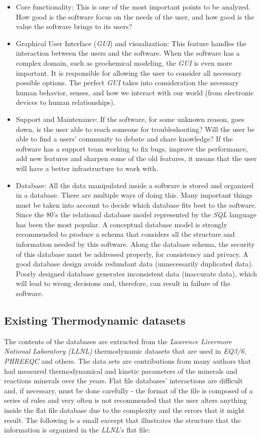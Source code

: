 \begin{itemize}
\item Core functionality: This is one of the most important points to be analyzed. How good is the software focus on the needs of the user, and how good is the value the software brings to its users?

\item Graphical User Interface (\emph{GUI}) and visualization: This feature handles the interaction between the users and the software. When the software has a complex domain, such as geochemical modeling, the \emph{GUI} is even more important. It is responsible for allowing the user to consider all necessary possible options. The perfect \emph{GUI} takes into consideration the necessary human behavior, senses, and how we interact with our world (from electronic devices to human relationships).

\item Support and Maintenance: If the software, for some unknown reason, goes down, is the user able to reach someone for troubleshooting? Will the user be able to find a users' community to debate and share knowledge? If the software has a support team working to fix bugs, improve the performance, add new features and sharpen some of the old features, it means that the user will have a better infrastructure to work with.

\item Database: All the data manipulated inside a software is stored and organized in a database. There are multiple ways of doing this. Many important things must be taken into account to decide which database fits best to the software. Since the 80's the relational database model represented by the \emph{SQL} language has been the most popular. A conceptual database model is strongly recommended to produce a schema that considers all the structure and information needed by this software. Along the database schema, the security of this database must be addressed properly, for consistency and privacy. A good database design avoids redundant data (unnecessarily duplicated data). Poorly designed database generates inconsistent data (inaccurate data), which will lead to wrong decisions and, therefore, can result in failure of the software.
\end{itemize}


\subsection{Existing Thermodynamic datasets}
The contents of the databases are extracted from the \emph{Lawrence Livermore National Laboratory (LLNL)} thermodynamic datasets that are used in \emph{EQ3/6}, \emph{PHREEQC} and others. The data sets are contributions from many authors that had measured thermodynamical and kinetic parameters of the minerals and reactions minerals over the years. Flat file databases' interactions are difficult and, if necessary, must be done carefully - the format of the file is composed of a series of rules and very often is not recommended that the user alters anything inside the flat file database due to the complexity and the errors that it might result. The following is a small excerpt that illustrates the structure that the information is organized in the \emph{LLNL}'s flat file:

